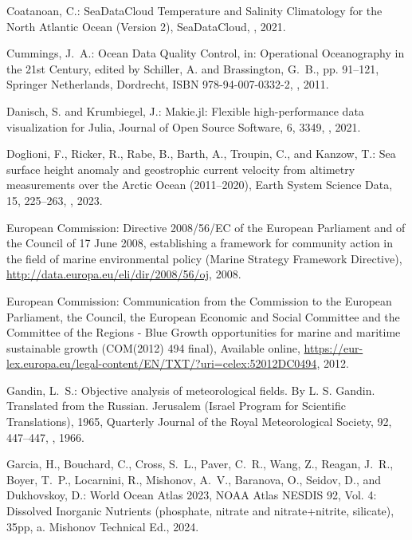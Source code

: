 \documentclass[essd,manuscript]{copernicus}
\begin{document}
\begin{thebibliography}{52}
Coatanoan, C.: SeaDataCloud Temperature and Salinity Climatology for the North
  Atlantic Ocean (Version 2), SeaDataCloud, , 2021.

Cummings, J.~A.: Ocean Data Quality Control, in: Operational Oceanography in
  the 21st Century, edited by Schiller, A. and Brassington, G.~B., pp. 91--121,
  Springer Netherlands, Dordrecht, ISBN 978-94-007-0332-2,
  , 2011.

Danisch, S. and Krumbiegel, J.: {Makie.jl: Flexible high-performance data
  visualization for Julia}, Journal of Open Source Software, 6, 3349,
  , 2021.

Doglioni, F., Ricker, R., Rabe, B., Barth, A., Troupin, C., and Kanzow, T.: Sea
  surface height anomaly and geostrophic current velocity from altimetry
  measurements over the Arctic Ocean (2011–2020), Earth System Science Data,
  15, 225–263, , 2023.

{European Commission}: {Directive 2008/56/EC of the European Parliament and of
  the Council of 17 June 2008, establishing a framework for community action in
  the field of marine environmental policy (Marine Strategy Framework
  Directive)}, \urlprefix\url{http://data.europa.eu/eli/dir/2008/56/oj}, 2008.

{European Commission}: {Communication from the Commission to the European
  Parliament, the Council, the European Economic and Social Committee and the
  Committee of the Regions - Blue Growth opportunities for marine and maritime
  sustainable growth (COM(2012) 494 final)}, Available online,
  \urlprefix\url{https://eur-lex.europa.eu/legal-content/EN/TXT/?uri=celex:52012DC0494},
  2012.

Gandin, L.~S.: {Objective analysis of meteorological fields. By L. S. Gandin.
  Translated from the Russian. Jerusalem (Israel Program for Scientific
  Translations), 1965}, Quarterly Journal of the Royal Meteorological Society,
  92, 447--447, , 1966.

Garcia, H., Bouchard, C., Cross, S.~L., Paver, C.~R., Wang, Z., Reagan, J.~R.,
  Boyer, T.~P., Locarnini, R., Mishonov, A.~V., Baranova, O., Seidov, D., and
  Dukhovskoy, D.: {World Ocean Atlas 2023}, NOAA Atlas NESDIS 92, {Vol. 4}:
  Dissolved Inorganic Nutrients (phosphate, nitrate and nitrate+nitrite,
  silicate), 35pp, a. Mishonov Technical Ed., 2024{}.


\end{thebibliography}
\end{document}
